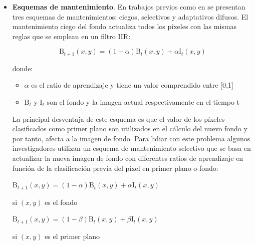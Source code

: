 \begin{itemize}
    \item \textbf{Esquemas de mantenimiento}. En trabajos previos como en \cite{4712338} se presentan tres esquemas de mantenimientos: ciegos, selectivos y adaptativos difusos. El mantenimiento ciego del fondo actualiza todos los píxeles con las mismas reglas que se emplean en un filtro IIR:
    
    \begin{equation}
    \label{eq:IIR-filter}
    \text{B}_{t+1}(x,y) = (1 - \alpha)\text{B}_{t}(x,y) + \alpha\text{I}_{t}(x,y)
    \end{equation}
    
    donde:
    
    \begin{itemize}
        \item $\alpha$ es el ratio de aprendizaje y tiene un valor comprendido entre [0,1]
        \item $\text{B}_{t}$ y $\text{I}_{t}$ son el fondo y la imagen actual respectivamente en el tiempo t
    \end{itemize}
    
    La principal desventaja de este esquema es que el valor de los píxeles clasificados como primer plano son utilizados en el cálculo del nuevo fondo y por tanto, afecta a la imagen de fondo. Para lidiar con este problema algunos investigadores utilizan un esquema de mantenimiento selectivo que se basa en actualizar la nueva imagen de fondo con diferentes ratios de aprendizaje en función de la clasificación previa del píxel en primer plano o fondo:
    
    \vspace{0.5cm}

    $\text{B}_{t+1}(x,y) = (1 - \alpha)\text{B}_{t}(x,y) + \alpha\text{I}_{t}(x,y)$
    
    \vspace{0.5cm}
    
    si $(x,y)$ es el fondo
    
    \vspace{0.5cm}

    $\text{B}_{t+1}(x,y) = (1 - \beta)\text{B}_{t}(x,y) + \beta\text{I}_{t}(x,y)$
    
    \vspace{0.5cm}
    
    si $(x,y)$ es el primer plano
    
    \vspace{0.5cm}
    

\end{itemize}
